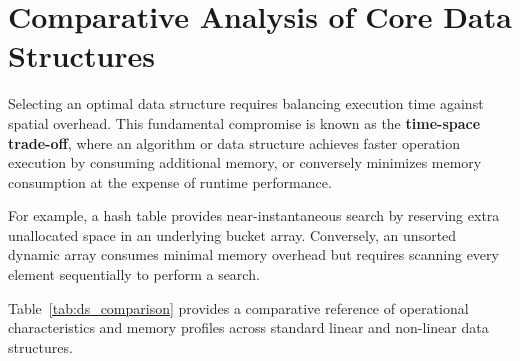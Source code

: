 \documentclass[12pt]{report}
\begin{document}
\section{Comparative Analysis of Core Data Structures}

Selecting an optimal data structure requires balancing execution time against spatial overhead. This fundamental compromise is known as the \textbf{time-space trade-off}, where an algorithm or data structure achieves faster operation execution by consuming additional memory, or conversely minimizes memory consumption at the expense of runtime performance.

For example, a hash table provides near-instantaneous search by reserving extra unallocated space in an underlying bucket array. Conversely, an unsorted dynamic array consumes minimal memory overhead but requires scanning every element sequentially to perform a search.

Table~\ref{tab:ds_comparison} provides a comparative reference of operational characteristics and memory profiles across standard linear and non-linear data structures.
\end{document}
